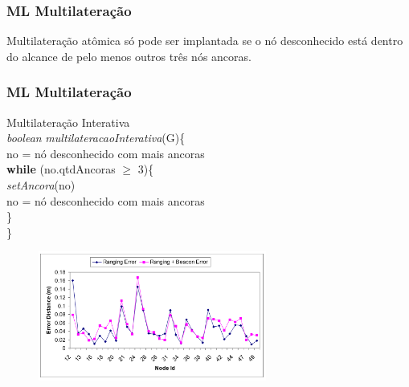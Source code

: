 \documentclass{beamer}
\begin{document}
\begin{frame}
\frametitle{\normalsize ML Multilateração}
\begin{flushleft}
	\vspace{0.5cm}		
		\begin{center}
			Multilateração atômica só pode ser implantada se o nó desconhecido está dentro do alcance de pelo menos outros três nós ancoras.
		\end{center}
	\vspace{0.4cm}
\end{flushleft}
\end{frame}


\begin{frame}
\frametitle{\normalsize ML Multilateração}
\begin{flushleft}
	\vspace{-0.2cm}
	Multilateração Interativa\\
	\vspace{0.3cm}
		\textit{boolean} \textit{multilateracaoInterativa}(G)\{
			\\ \hspace{0.5cm} no = nó desconhecido com mais ancoras
			 \\ \hspace{0.5cm} \textbf{while} (no.qtdAncoras $\geq$ 3)\{
			 \\ \hspace{1.5cm} \textit{setAncora}(no)
			 \\ \hspace{1.5cm} no = nó desconhecido com mais ancoras
			\\ \hspace{0.5cm} \}
			\\\}
	\vspace{-1.0cm}
	
	\begin{figure} 
		\includegraphics[width=7.5cm]{mli} 
	\end{figure}
\end{flushleft}
\end{frame}
\end{document}
